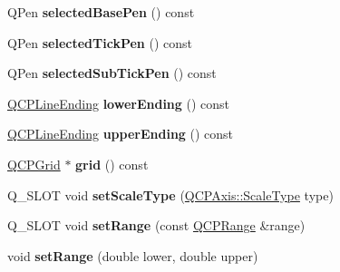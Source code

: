 \begin{DoxyCompactItemize}
\item 
Q\+Pen {\bfseries selected\+Base\+Pen} () const \hypertarget{class_q_c_p_axis_a5a3919ad7b60c2789b04c7e72387cfd6}{}\label{class_q_c_p_axis_a5a3919ad7b60c2789b04c7e72387cfd6}

\item 
Q\+Pen {\bfseries selected\+Tick\+Pen} () const \hypertarget{class_q_c_p_axis_a9f86ef82e1d1a908ab4c68cfa5fe4175}{}\label{class_q_c_p_axis_a9f86ef82e1d1a908ab4c68cfa5fe4175}

\item 
Q\+Pen {\bfseries selected\+Sub\+Tick\+Pen} () const \hypertarget{class_q_c_p_axis_a1b264fdfef48c22aba36e76de7856784}{}\label{class_q_c_p_axis_a1b264fdfef48c22aba36e76de7856784}

\item 
\hyperlink{class_q_c_p_line_ending}{Q\+C\+P\+Line\+Ending} {\bfseries lower\+Ending} () const \hypertarget{class_q_c_p_axis_ac85aebbedf67d7bc9e1e5c182151536b}{}\label{class_q_c_p_axis_ac85aebbedf67d7bc9e1e5c182151536b}

\item 
\hyperlink{class_q_c_p_line_ending}{Q\+C\+P\+Line\+Ending} {\bfseries upper\+Ending} () const \hypertarget{class_q_c_p_axis_aad503ac95ee34e614ffee0bd66473e1a}{}\label{class_q_c_p_axis_aad503ac95ee34e614ffee0bd66473e1a}

\item 
\hyperlink{class_q_c_p_grid}{Q\+C\+P\+Grid} $\ast$ {\bfseries grid} () const \hypertarget{class_q_c_p_axis_a6757e19b6c3f5ccd245029366df88a78}{}\label{class_q_c_p_axis_a6757e19b6c3f5ccd245029366df88a78}

\item 
Q\+\_\+\+S\+L\+OT void {\bfseries set\+Scale\+Type} (\hyperlink{class_q_c_p_axis_a36d8e8658dbaa179bf2aeb973db2d6f0}{Q\+C\+P\+Axis\+::\+Scale\+Type} type)\hypertarget{class_q_c_p_axis_ac5a0e28e2e93b66ef8d39a5bb7a6bdfb}{}\label{class_q_c_p_axis_ac5a0e28e2e93b66ef8d39a5bb7a6bdfb}

\item 
Q\+\_\+\+S\+L\+OT void {\bfseries set\+Range} (const \hyperlink{class_q_c_p_range}{Q\+C\+P\+Range} \&range)\hypertarget{class_q_c_p_axis_a1b0b4637dd2cc1506b87e49dae0152d3}{}\label{class_q_c_p_axis_a1b0b4637dd2cc1506b87e49dae0152d3}

\item 
void {\bfseries set\+Range} (double lower, double upper)\hypertarget{class_q_c_p_axis_a57d6ee9e9009fe88cb19db476ec70bca}{}\label{class_q_c_p_axis_a57d6ee9e9009fe88cb19db476ec70bca}


\end{DoxyCompactItemize}
